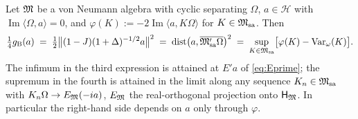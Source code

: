 \documentclass[11pt]{article}
\newcommand{\Om}{\Omega}
\newcommand{\Hil}{\mathcal H}
\newcommand{\Msa}{\cM_{\mathrm{sa}}}
\newcommand{\Mpsa}{\cM'_{\mathrm{sa}}}
\newcommand{\HM}{\mathsf H_{\cM}}
\newcommand{\Var}{\operatorname{Var}}
\newcommand{\dist}{\operatorname{dist}}
\newcommand{\gB}{g_{\mathrm B}}
\newcommand{\ip}[2]{\langle #1,#2\rangle}
\begin{document}
\begin{theorem}\label{thm:three}
Let $\mathfrak M$ be a von Neumann algebra with cyclic separating $\Om$, $a\in\Hil$ with $\operatorname{Im}\ip{\Om}{a}=0$,
and $\varphi(K):=-2\operatorname{Im}\ip{a}{K\Om}$ for $K\in\Msa$.  Then
\begin{equation}\label{eq:three}
 \tfrac14\gB(a)\;=\;\tfrac12\bigl\|(1-J)(1+\Delta)^{-1/2}a\bigr\|^2
 \;=\;\dist\bigl(a,\overline{\Mpsa\Om}\bigr)^2
 \;=\;\sup_{K\in\Msa}\bigl[\varphi(K)-\Var_\omega(K)\bigr].
\end{equation}
The infimum in the third expression is attained at $E'a$ of \eqref{eq:Eprime}; the supremum in the fourth is attained
in the limit along any sequence $K_n\in\Msa$ with $K_n\Om\to E_{\cM}(-ia)$, $E_{\mathfrak M}$ the real-orthogonal projection
onto $\HM$.  In particular the right-hand side depends on $a$ only through $\varphi$.
\end{theorem}
\end{document}
